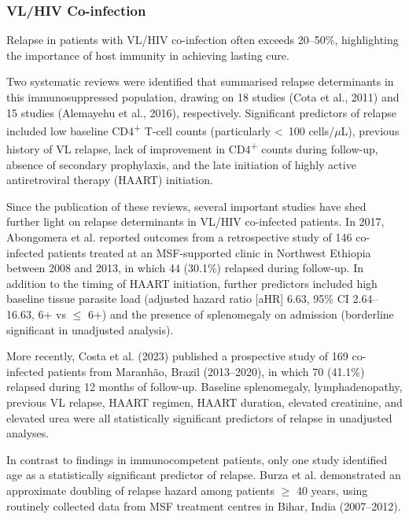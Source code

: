 

\subsubsection{VL/HIV Co-infection}

Relapse  in patients with VL/HIV co-infection often exceeds 20--50\%\cite{cota2011, diro2019, burza2014a}, highlighting the importance of host immunity in achieving lasting cure.

Two systematic reviews were identified that summarised relapse determinants in this immunosuppressed population, drawing on 18 studies (Cota et al., 2011)\cite{cota2011} and 15 studies (Alemayehu et al., 2016)\cite{alemayehu2016}, respectively. Significant predictors of relapse included low baseline CD4\textsuperscript{+} T-cell counts (particularly <~100 cells/$\mu$L), previous history of VL relapse, lack of improvement in CD4\textsuperscript{+} counts during follow-up, absence of secondary prophylaxis, and the late initiation of highly active antiretroviral therapy (HAART) initiation.

Since the publication of these reviews, several important studies have shed further light on relapse determinants in VL/HIV co-infected patients\cite{abongomera2017a, costa2023-hiv, diro2019}. In 2017, Abongomera et al. reported outcomes from a retrospective study of 146 co-infected patients treated at an MSF-supported clinic in Northwest Ethiopia between 2008 and 2013, in which 44 (30.1\%) relapsed during follow-up. In addition to the timing of HAART initiation, further predictors included high baseline tissue parasite load (adjusted hazard ratio [aHR] 6.63, 95\% CI 2.64--16.63, 6+ vs $\leq$ 6+) and the presence of splenomegaly on admission (borderline significant in unadjusted analysis)\cite{abongomera2017a}.

More recently, Costa et al. (2023) published a prospective study of 169 co-infected patients from Maranhão, Brazil (2013--2020), in which 70 (41.1\%) relapsed during 12 months of follow-up. Baseline splenomegaly, lymphadenopathy, previous VL relapse, HAART regimen, HAART duration, elevated creatinine, and elevated urea were all statistically significant predictors of relapse in unadjusted analyses\cite{costa2023-hiv}.

In contrast to findings in immunocompetent patients, only one study identified age as a statistically significant predictor of relapse. Burza et al. demonstrated an approximate doubling of relapse hazard among patients $\geq$ 40 years, using routinely collected data from MSF treatment centres in Bihar, India (2007--2012)\cite{burza2014a}.

